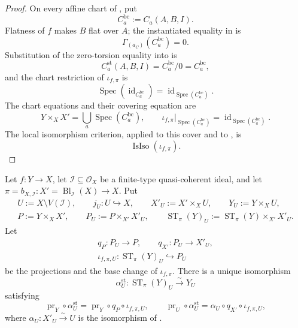 \begin{proof}
  On every affine chart of
  , put
  \[
    C_a^{\mathrm{bc}}:=C_a(A,B,I).
  \]
  Flatness of $f$ makes $B$ flat over $A$; the instantiated equality in
   is
  \[
    \Gamma_{(a_C)}(C_a^{\mathrm{bc}})=0.
  \]
  Substitution of the zero-torsion equality into
   is
  \[
    C_a^{\mathrm{st}}(A,B,I)
      =C_a^{\mathrm{bc}}/0=C_a^{\mathrm{bc}},
  \]
  and the chart restriction of $\iota_{f,\pi}$ is
  \[
    \operatorname{Spec}(\operatorname{id}_{C_a^{\mathrm{bc}}})
      =\operatorname{id}_{\operatorname{Spec}(C_a^{\mathrm{bc}})}.
  \]
  The chart equations and their covering equation are
  \[
    Y\times_XX'=\bigcup_a\operatorname{Spec}(C_a^{\mathrm{bc}}),\qquad
    \iota_{f,\pi}|_{\operatorname{Spec}(C_a^{\mathrm{bc}})}
      =\operatorname{id}_{\operatorname{Spec}(C_a^{\mathrm{bc}})}.
  \]
  The local isomorphism criterion, applied to this cover and to
  , is
  \[
    \operatorname{IsIso}(\iota_{f,\pi}).
  \]
\end{proof}

\begin{lemma}
  \label{lemma:nagata-strict-transform-over-complement}
  \lean{}

  Let $f\colon Y\to X$, let
  $\mathcal I\subseteq\mathcal O_X$ be a finite-type quasi-coherent ideal,
  and let
  $\pi=b_{X,\mathcal I}\colon X'=\operatorname{Bl}_{\mathcal I}(X)\to X$.
  Put
  \[
  \begin{gathered}
    U:=X\setminus V(\mathcal I),\qquad
    j_U\colon U\hookrightarrow X,\qquad
    X'_U:=X'\times_XU,\qquad
    Y_U:=Y\times_XU,\\
    P:=Y\times_XX',\qquad
    P_U:=P\times_{X'}X'_U,\qquad
    \operatorname{ST}_\pi(Y)_U
      :=\operatorname{ST}_\pi(Y)\times_{X'}X'_U.
  \end{gathered}
  \]
  Let
  \[
  \begin{gathered}
    q_P\colon P_U\to P,\qquad q_{X'}\colon P_U\to X'_U,\\
    \iota_{f,\pi,U}\colon\operatorname{ST}_\pi(Y)_U\hookrightarrow P_U
  \end{gathered}
  \]
  be the projections and the base change of $\iota_{f,\pi}$.
  There is a unique isomorphism
  \[
    \alpha^{\mathrm{st}}_U\colon
      \operatorname{ST}_\pi(Y)_U\xrightarrow{\sim}Y_U
  \]
  satisfying
  \[
    \operatorname{pr}_Y\circ\alpha^{\mathrm{st}}_U
      =\operatorname{pr}_Y\circ q_P\circ\iota_{f,\pi,U},
    \qquad
    \operatorname{pr}_U\circ\alpha^{\mathrm{st}}_U
      =\alpha_U\circ q_{X'}\circ\iota_{f,\pi,U},
  \]
  where $\alpha_U\colon X'_U\xrightarrow{\sim}U$ is the isomorphism of
  .
\end{lemma}

